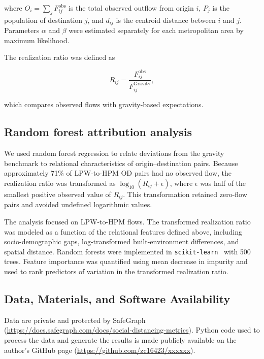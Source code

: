 \documentclass[9pt,twocolumn,twoside]{pnas-new}
\begin{document}
\noindent where $O_i = \sum_j F_{ij}^{\text{obs}}$ is the total observed outflow from origin $i$, $P_j$ is the population of destination $j$, and $d_{ij}$ is the centroid distance between $i$ and $j$. Parameters $\alpha$ and $\beta$ were estimated separately for each metropolitan area by maximum likelihood.

The realization ratio was defined as

\begin{equation}
	R_{ij} = \frac{F_{ij}^{\text{obs}}}{F_{ij}^{\text{Gravity}}},
\end{equation}

\noindent which compares observed flows with gravity-based expectations.

\subsection*{Random forest attribution analysis}

We used random forest regression to relate deviations from the gravity benchmark to relational characteristics of origin--destination pairs. Because approximately 71\% of LPW-to-HPM OD pairs had no observed flow, the realization ratio was transformed as $\log_{10}(R_{ij}+\epsilon)$, where $\epsilon$ was half of the smallest positive observed value of $R_{ij}$. This transformation retained zero-flow pairs and avoided undefined logarithmic values.

The analysis focused on LPW-to-HPM flows. The transformed realization ratio was modeled as a function of the relational features defined above, including socio-demographic gaps, log-transformed built-environment differences, and spatial distance. Random forests were implemented in \texttt{scikit-learn}~\cite{pedregosa2011scikit} with 500 trees. Feature importance was quantified using mean decrease in impurity and used to rank predictors of variation in the transformed realization ratio.

\subsection*{Data, Materials, and Software Availability} 
Data are private and protected by SafeGraph (\url{https://docs.safegraph.com/docs/social-distancing-metrics}). Python code used to process the data and generate the results is made publicly available on the author’s GitHub page (\url{https://github.com/zc16423/xxxxxx}).\\

\showacknow

\bibsplit[23]



\end{document}

